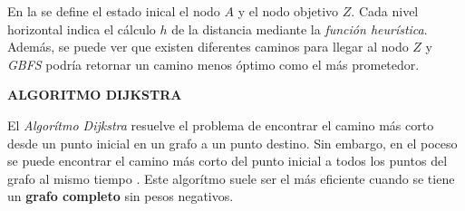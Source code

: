 En la  se define el estado inical el nodo $A$ y el nodo objetivo $Z$. Cada nivel horizontal indica el cálculo $h$ de la distancia mediante la \textit{función heurística}. Además, se puede ver que existen diferentes caminos para llegar al nodo $Z$ y \textit{GBFS} podría retornar un camino menos óptimo como el más prometedor.

\textbf{ALGORITMO DIJKSTRA}

El \textit{Algorítmo Dijkstra} resuelve el problema de encontrar el camino más corto desde un punto inicial en un grafo a un punto destino. Sin embargo, en el poceso se puede encontrar el camino más corto del punto inicial a todos los puntos del grafo al mismo tiempo \parencite{javaid2013understanding}. Este algorítmo suele ser el más eficiente cuando se tiene un \textbf{grafo completo} sin pesos negativos. 




